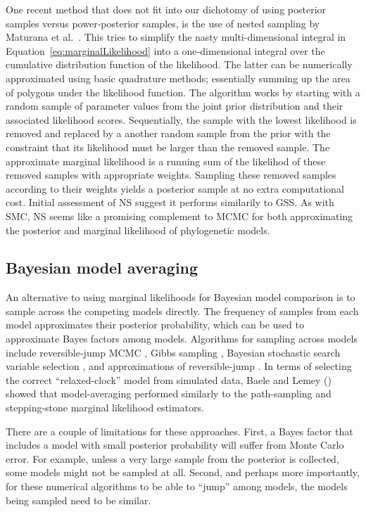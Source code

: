 One recent method that does not fit into our dichotomy of using
posterior samples versus power-posterior samples, is the
use of nested sampling by Maturana et al.\ \citeyear{Maturana2017}.
This tries to simplify the nasty multi-dimensional integral in
Equation~\ref{eq:marginalLikelihood}
into a one-dimensional integral over the cumulative distribution function
of the likelihood.
The latter can be numerically approximated using basic quadrature methods;
essentially summing up the area of polygons under the likelihood function.
The algorithm works by starting with a random sample of parameter values
from the joint prior distribution and their associated likelihood
scores.
Sequentially, the sample with the lowest likelihood is removed and replaced by
a another random sample from the prior with the constraint that its likelihood
must be larger than the removed sample.
The approximate marginal likelihood is a running sum of the likelihod of these
removed samples with appropriate weights.
Sampling these removed samples according to their weights yields a posterior
sample at no extra computational cost.
Initial assessment of NS suggest it performs similarily to GSS.
As with SMC, NS seems like a promising complement to MCMC for both
approximating the posterior and marginal likelihood of phylogenetic models.


\subsection{Bayesian model averaging}

An alternative to using marginal likelihoods for Bayesian model comparison is
to sample across the competing models directly.
The frequency of samples from each model approximates their posterior
probability, which can be used to approximate Bayes factors among models.
Algorithms for sampling across models include reversible-jump MCMC
\citep{Green1995}, Gibbs sampling \citep{Neal2000}, Bayesian stochastic search
variable selection \citep{George1993,Kuo1998}, and approximations of reversible-jump
\citep{Jones2015}.
In terms of selecting the correct ``relaxed-clock'' model from simulated data,
Baele and Lemey (\citeyear{Baele2014}) showed that model-averaging performed
similarly to the path-sampling and stepping-stone marginal likelihood
estimators.

There are a couple of limitations for these approaches.
First, a Bayes factor that includes a model with small posterior probability
will suffer from Monte Carlo error.
For example, unless a very large sample from the posterior is collected, some
models might not be sampled at all.
Second, and perhaps more importantly, for these numerical algorithms to be able
to ``jump'' among models, the models being sampled need to be similar.

